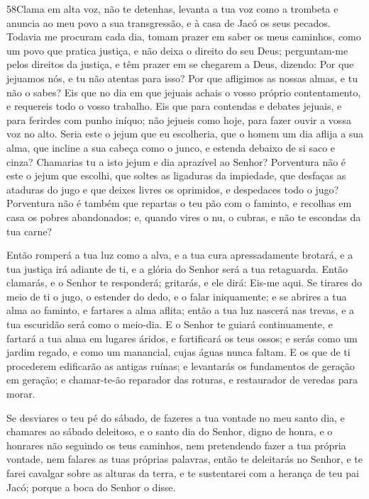 \medskip

\lettrine{58}{}Clama em alta voz, não te detenhas, levanta a
tua voz como a trombeta e anuncia ao meu povo a sua transgressão, e
à casa de Jacó os seus pecados. Todavia me procuram cada dia,
tomam prazer em saber os meus caminhos, como um povo que pratica
justiça, e não deixa o direito do seu Deus; perguntam-me pelos
direitos da justiça, e têm prazer em se chegarem a Deus,
dizendo: Por que jejuamos nós, e tu não atentas para isso? Por
que afligimos as nossas almas, e tu não o sabes? Eis que no dia em
que jejuais achais o vosso próprio contentamento, e requereis todo o
vosso trabalho. Eis que para contendas e debates jejuais, e para
ferirdes com punho iníquo; não jejueis como hoje, para fazer ouvir a
vossa voz no alto. Seria este o jejum que eu escolheria, que o
homem um dia aflija a sua alma, que incline a sua cabeça como o
junco, e estenda debaixo de si saco e cinza? Chamarias tu a isto
jejum e dia aprazível ao Senhor? Porventura não é este o jejum
que escolhi, que soltes as ligaduras da impiedade, que desfaças as
ataduras do jugo e que deixes livres os oprimidos, e despedaces todo
o jugo? Porventura não é também que repartas o teu pão com o
faminto, e recolhas em casa os pobres abandonados; e, quando vires o
nu, o cubras, e não te escondas da tua carne?

Então romperá a tua luz como a alva, e a tua cura apressadamente
brotará, e a tua justiça irá adiante de ti, e a glória do Senhor
será a tua retaguarda. Então clamarás, e o Senhor te responderá;
gritarás, e ele dirá: Eis-me aqui. Se tirares do meio de ti o jugo,
o estender do dedo, e o falar iniquamente; e se abrires a tua
alma ao faminto, e fartares a alma aflita; então a tua luz nascerá
nas trevas, e a tua escuridão será como o meio-dia. E o
Senhor te guiará continuamente, e fartará a tua alma em lugares
áridos, e fortificará os teus ossos; e serás como um jardim regado,
e como um manancial, cujas águas nunca faltam. E os que de ti
procederem edificarão as antigas ruínas; e levantarás os fundamentos
de geração em geração; e chamar-te-ão reparador das roturas, e
restaurador de veredas para morar.

Se desviares o teu pé do sábado, de fazeres a tua vontade no meu
santo dia, e chamares ao sábado deleitoso, e o santo dia do Senhor,
digno de honra, e o honrares não seguindo os teus caminhos, nem
pretendendo fazer a tua própria vontade, nem falares as tuas
próprias palavras, então te deleitarás no Senhor, e te farei
cavalgar sobre as alturas da terra, e te sustentarei com a herança
de teu pai Jacó; porque a boca do Senhor o disse.

